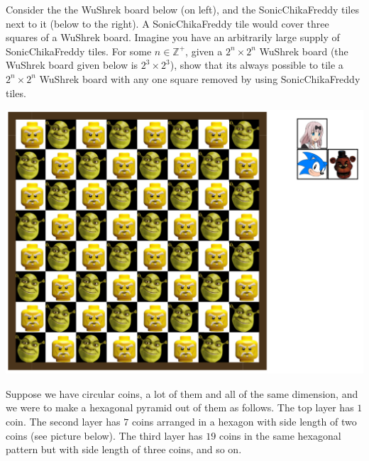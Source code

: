 \documentclass[a4paper]{exam}
\begin{document}
\begin{questions}
  \begin{solution}
  \end{solution}

   Consider the the WuShrek board below (on left), and the SonicChikaFreddy tiles next to it (below to the right). A SonicChikaFreddy tile would cover three squares of a WuShrek board. Imagine you have an arbitrarily large supply of SonicChikaFreddy tiles. For some $n \in \mathbb{Z}^+$, given a $2^n \times 2^n$ WuShrek board (the WuShrek board given below is $2^3\times 2^3$), show that its always possible to tile a $2^n \times 2^n$ WuShrek board with any one square removed by using SonicChikaFreddy tiles.
  \begin{center}
      \includegraphics[scale = 0.25]{WuShrekSonicChikaFreddy.png}
  \end{center}
  \begin{solution}
  \end{solution}
  
    Suppose we have circular coins, a lot of them and all of the same dimension, and we were to make a hexagonal pyramid out of them as follows. The top layer has $1$ coin. The second layer has $7$ coins arranged in a hexagon with side length of two coins (see picture below). The third layer has $19$ coins in the same hexagonal pattern but with side length of three coins, and so on.


\end{questions}
\end{document}
